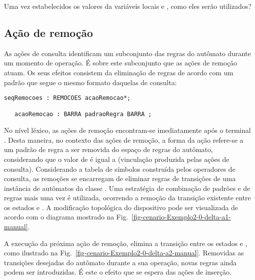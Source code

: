 Uma vez estabelecidos os valores da variáveis locais  e , como eles serão utilizados?

\subsection*{Ação de remoção}

As ações de consulta identificam um subconjunto das regras do autômato durante um momento de operação. É sobre este subconjunto que as ações de remoção atuam. Os seus efeitos consistem da eliminação de regras de acordo com um padrão que segue o mesmo formato daquelas de consulta:

\begin{lstlisting}[style=antlr]
seqRemocoes : REMOCOES acaoRemocao*;

   acaoRemocao : BARRA padraoRegra BARRA ;
\end{lstlisting}

\noindent
No nível léxico, as ações de remoção encontram-se imediatamente após o terminal . Desta maneira, no contexto das ações de remoção, a forma da ação  refere-se a um padrão de regra a ser removida do espaço de regras do autômato, considerando que o valor de  é igual a  (vinculação produzida pelas ações de consulta). Considerando a tabela de símbolos construída pelos operadores de consulta, as remoções se encarregam de eliminar regras de transições de uma instância de autômatos da classe . Uma estratégia de combinação de padrões e de regras mais uma vez é utilizada, ocorrendo a remoção da transição existente entre os estados  e . A modificação topológica do dispositivo  pode ser visualizada de acordo com o diagrama mostrado na Fig.~\ref{fig-cenario-Exemplo2-0-delta-a1-manual}.


A execução da próxima ação de remoção, elimina a transição entre os estados  e , como ilustrado na Fig.~\ref{fig-cenario-Exemplo2-0-delta-a2-manual}. Removidas as transições desejadas do autômato durante a sua operação, novas regras ainda podem ser introduzidas. É este o efeito que se espera das ações de inserção.


